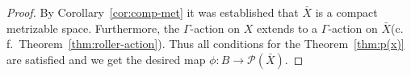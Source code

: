 \begin{proof}
  By Corollary~\ref{cor:comp-met} it was established that \(\bar X\) is a compact metrizable space. Furthermore, the \(\Gamma\)-action on \(X\) extends to a \(\Gamma\)-action on \(\bar X\)(c.\,f.\ Theorem~\ref{thm:roller-action}). Thus all conditions for the Theorem~\ref{thm:p(x)} are satisfied and we get the desired map \(\phi\colon B \to \mathcal{P}(\bar X)\).
\end{proof}

